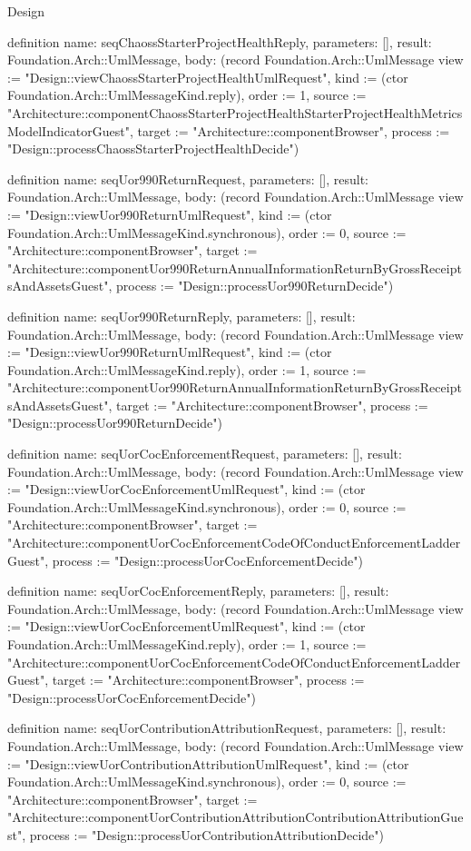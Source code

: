 \begin{lexlean}{Design}
\begin{semanticmodule}
definition{
  name: seqChaossStarterProjectHealthReply,
  parameters: [],
  result: Foundation.Arch::UmlMessage,
  body: (record Foundation.Arch::UmlMessage {view := "Design::viewChaossStarterProjectHealthUmlRequest", kind := (ctor Foundation.Arch::UmlMessageKind.reply), order := 1, source := "Architecture::componentChaossStarterProjectHealthStarterProjectHealthMetricsModelIndicatorGuest", target := "Architecture::componentBrowser", process := "Design::processChaossStarterProjectHealthDecide"})
}

definition{
  name: seqUor990ReturnRequest,
  parameters: [],
  result: Foundation.Arch::UmlMessage,
  body: (record Foundation.Arch::UmlMessage {view := "Design::viewUor990ReturnUmlRequest", kind := (ctor Foundation.Arch::UmlMessageKind.synchronous), order := 0, source := "Architecture::componentBrowser", target := "Architecture::componentUor990ReturnAnnualInformationReturnByGrossReceiptsAndAssetsGuest", process := "Design::processUor990ReturnDecide"})
}

definition{
  name: seqUor990ReturnReply,
  parameters: [],
  result: Foundation.Arch::UmlMessage,
  body: (record Foundation.Arch::UmlMessage {view := "Design::viewUor990ReturnUmlRequest", kind := (ctor Foundation.Arch::UmlMessageKind.reply), order := 1, source := "Architecture::componentUor990ReturnAnnualInformationReturnByGrossReceiptsAndAssetsGuest", target := "Architecture::componentBrowser", process := "Design::processUor990ReturnDecide"})
}

definition{
  name: seqUorCocEnforcementRequest,
  parameters: [],
  result: Foundation.Arch::UmlMessage,
  body: (record Foundation.Arch::UmlMessage {view := "Design::viewUorCocEnforcementUmlRequest", kind := (ctor Foundation.Arch::UmlMessageKind.synchronous), order := 0, source := "Architecture::componentBrowser", target := "Architecture::componentUorCocEnforcementCodeOfConductEnforcementLadderGuest", process := "Design::processUorCocEnforcementDecide"})
}

definition{
  name: seqUorCocEnforcementReply,
  parameters: [],
  result: Foundation.Arch::UmlMessage,
  body: (record Foundation.Arch::UmlMessage {view := "Design::viewUorCocEnforcementUmlRequest", kind := (ctor Foundation.Arch::UmlMessageKind.reply), order := 1, source := "Architecture::componentUorCocEnforcementCodeOfConductEnforcementLadderGuest", target := "Architecture::componentBrowser", process := "Design::processUorCocEnforcementDecide"})
}

definition{
  name: seqUorContributionAttributionRequest,
  parameters: [],
  result: Foundation.Arch::UmlMessage,
  body: (record Foundation.Arch::UmlMessage {view := "Design::viewUorContributionAttributionUmlRequest", kind := (ctor Foundation.Arch::UmlMessageKind.synchronous), order := 0, source := "Architecture::componentBrowser", target := "Architecture::componentUorContributionAttributionContributionAttributionGuest", process := "Design::processUorContributionAttributionDecide"})
}


\end{semanticmodule}
\end{lexlean}
